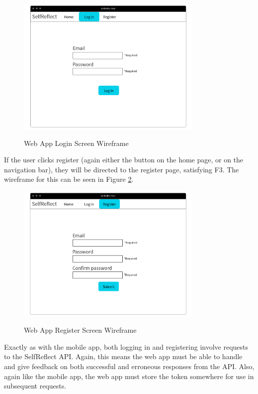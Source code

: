 \documentclass[11pt,openright,a4paper]{report}
\begin{document}
\begin{figure}[ht]
\centering
\caption{Web App Login Screen Wireframe}
\includegraphics[width=0.8\textwidth]{i/weblogin.png}
\label{fig:weblogin}
\end{figure}

\newpage

If the user clicks register (again either the button on the home page, or on the navigation bar), they will be directed to the register page, satisfying F3. The wireframe for this can be seen in Figure \ref{fig:webregister}.

\begin{figure}[ht]
\centering
\caption{Web App Register Screen Wireframe}
\includegraphics[width=0.8\textwidth]{i/webregister.png}
\label{fig:webregister}
\end{figure}

Exactly as with the mobile app, both logging in and registering involve requests to the SelfReflect API. Again, this means the web app must be able to handle and give feedback on both successful and erroneous responses from the API. Also, again like the mobile app, the web app must store the token somewhere for use in subsequent requests.
\end{document}
